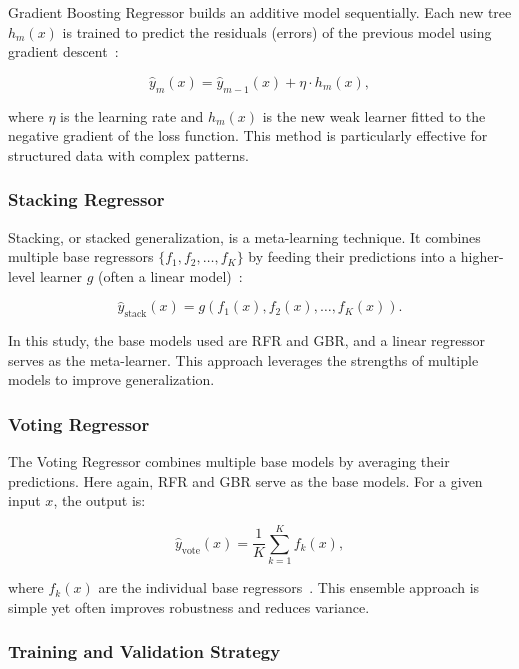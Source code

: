 \documentclass[class=scrbook, crop=false]{standalone}
\begin{document}
	Gradient Boosting Regressor builds an additive model sequentially. Each new tree $h_m(x)$ is trained to predict the residuals (errors) of the previous model using gradient descent~\cite{friedman2001greedy}:
	
	\begin{equation}
		\hat{y}_m(x) = \hat{y}_{m-1}(x) + \eta \cdot h_m(x),
	\end{equation}
	
	where $\eta$ is the learning rate and $h_m(x)$ is the new weak learner fitted to the negative gradient of the loss function. This method is particularly effective for structured data with complex patterns.
	
	\subsubsection*{Stacking Regressor}
	
	Stacking, or stacked generalization, is a meta-learning technique. It combines multiple base regressors $\{f_1, f_2, \dots, f_K\}$ by feeding their predictions into a higher-level learner $g$ (often a linear model)~\cite{wolpert1992stacked}:
	
	\begin{equation}
		\hat{y}_{\text{stack}}(x) = g\left(f_1(x), f_2(x), \dots, f_K(x)\right).
	\end{equation}
	
	In this study, the base models used are RFR and GBR, and a linear regressor serves as the meta-learner. This approach leverages the strengths of multiple models to improve generalization.
	
	\subsubsection*{Voting Regressor}
	
	The Voting Regressor combines multiple base models by averaging their predictions. Here again, RFR and GBR serve as the base models. For a given input $x$, the output is:
	
	\begin{equation}
		\hat{y}_{\text{vote}}(x) = \frac{1}{K} \sum_{k=1}^{K} f_k(x),
	\end{equation}
	
	where $f_k(x)$ are the individual base regressors~\cite{zhang2012ensemble}. This ensemble approach is simple yet often improves robustness and reduces variance.
	
	\subsubsection*{Training and Validation Strategy}
	
\end{document}

